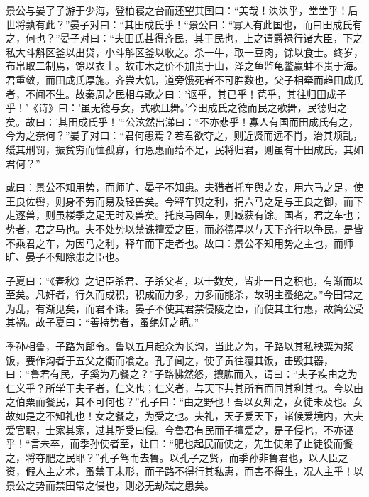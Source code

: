 \documentclass[]{article}
\begin{document}
景公与晏了子游于少海，登柏寝之台而还望其国曰：``美哉！泱泱乎，堂堂乎！后世将孰有此？''晏子对曰：``其田成氏乎！``景公曰：``寡人有此国也，而曰田成氏有之，何也？''晏子对曰：``夫田氏甚得齐民，其于民也，上之请爵禄行诸大臣，下之私大斗斛区釜以出贷，小斗斛区釜以收之。杀一牛，取一豆肉，馀以食士。终岁，布帛取二制焉，馀以衣士。故市木之价不加贵于山，泽之鱼监龟鳖赢蚌不贵于海。君重敛，而田成氏厚施。齐尝大饥，道旁饿死者不可胜数也，父子相牵而趋田成氏者，不闻不生。故秦周之民相与歌之曰：'讴乎，其已乎！苞乎，其往归田成子乎！'《诗》曰：'虽无德与女，式歌且舞。'今田成氏之德而民之歌舞，民德归之矣。故曰：'其田成氏乎！'``公泫然出涕曰：``不亦悲乎！寡人有国而田成氏有之，今为之奈何？''晏子对曰：``君何患焉？若君欲夺之，则近贤而远不肖，治其烦乱，缓其刑罚，振贫穷而恤孤寡，行恩惠而给不足，民将归君，则虽有十田成氏，其如君何？''

或曰：景公不知用势，而师旷、晏子不知患。夫猎者托车舆之安，用六马之足，使王良佐辔，则身不劳而易及轻兽矣。今释车舆之利，捐六马之足与王良之御，而下走逐兽，则虽楼季之足无时及兽矣。托良马固车，则臧获有馀。国者，君之车也；势者，君之马也。夫不处势以禁诛擅爱之臣，而必德厚以与天下齐行以争民，是皆不乘君之车，为因马之利，释车而下走者也。故曰：景公不知用势之主也，而师旷、晏子不知除患之臣也。

子夏曰：``《春秋》之记臣杀君、子杀父者，以十数矣，皆非一日之积也，有渐而以至矣。凡奸者，行久而成积，积成而力多，力多而能杀，故明主蚤绝之。''今田常之为乱，有渐见矣，而君不诛。晏子不使其君禁侵陵之臣，而使其主行惠，故简公受其祸。故子夏曰：``善持势者，蚤绝奸之萌。''

季孙相鲁，子路为郈令。鲁以五月起众为长沟，当此之为，子路以其私秧粟为浆饭，要作沟者于五父之衢而飡之。孔子闻之，使子贡往覆其饭，击毁其器，曰：``鲁君有民，子奚为乃餐之？''子路怫然怒，攘肱而入，请曰：``夫子疾由之为仁义乎？所学于夫子者，仁义也；仁义者，与天下共其所有而同其利其也。今以由之伯粟而餐民，其不可何也？''孔子曰：``由之野也！吾以女知之，女徒未及也。女故如是之不知礼也！女之餐之，为受之也。夫礼，天子爱天下，诸候爱境内，大夫爱官职，士家其家，过其所受曰侵。今鲁君有民而子擅爱之，是子侵也，不亦诬乎！``言未卒，而季孙使者至，让曰：``肥也起民而使之，先生使弟子止徒役而餐之，将夺肥之民耶？''孔子驾而去鲁。以孔子之贤，而季孙非鲁君也，以人臣之资，假人主之术，蚤禁于未形，而子路不得行其私惠，而害不得生，况人主乎！以景公之势而禁田常之侵也，则必无劫弑之患矣。
\end{document}
